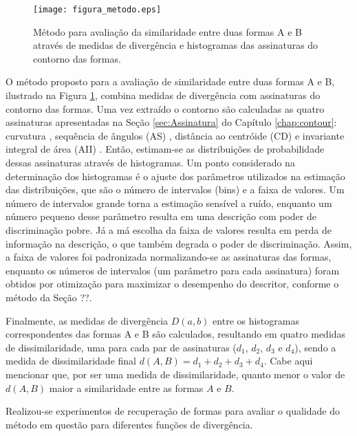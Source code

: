 \begin{figure}[]
  \caption{\label{fig:metodo_distancia} Método para avaliação da similaridade entre duas formas A e B através de medidas de divergência e histogramas das assinaturas do contorno das formas.}
  \centering
  \texttt{[image: figura\_metodo.eps]}
\end{figure}

O método proposto para a avaliação de similaridade entre duas formas A e B, ilustrado na Figura \ref{fig:metodo_distancia},  combina medidas de divergência com assinaturas do contorno das
formas. Uma vez extraído o contorno são calculadas as quatro assinaturas apresentadas na Seção \ref{sec:Assinatura} do Capítulo \ref{chap:contour}: curvatura \cite{149591,Costa:2009}, sequência de ângulos (AS) \cite{Fotopoulou:2013}, distância ao centróide (CD) \cite{Costa:2009} e invariante integral de área (AII) \cite{Manay:2006}. Então, estimam-se as distribuições de probabilidade dessas assinaturas através de histogramas. Um ponto considerado na determinação dos histogramas é o ajuste dos parâmetros utilizados na estimação das distribuições, que são o número de intervalos (bins) e a faixa de valores. Um número de intervalos grande torna a estimação sensível a ruído, enquanto um número pequeno desse parâmetro resulta em uma descrição com poder de discriminação pobre. Já a má escolha da faixa de valores resulta em perda de informação na descrição, o que também degrada o poder de discriminação.  Assim, a faixa de valores foi padronizada normalizando-se as assinaturas das formas, enquanto os números de intervalos (um parâmetro para cada assinatura) foram obtidos por otimização para maximizar o desempenho do descritor, conforme o método da Seção ??. 

Finalmente, as medidas de divergência $D(a,b)$ entre os histogramas correspondentes das formas A e B são calculados, resultando em quatro medidas de dissimilaridade, uma para cada par de assinaturas ($d_{1}$, $d_{2}$, $d_{3}$ e $d_{4}$), sendo a medida de dissimilaridade final $d(A,B) = d_{1}+d_{2}+d_{3}+d_{4}$. Cabe aqui mencionar que, por ser uma medida de dissimilaridade, quanto menor o valor de $d(A,B)$ maior a similaridade entre as formas $A$ e $B$. 

Realizou-se experimentos de recuperação de formas para avaliar o qualidade do método em questão para diferentes funções de divergência.


